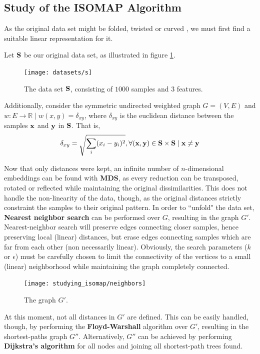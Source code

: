\subsection{Study of the ISOMAP Algorithm}
\label{sec:studying_ISOMAP}

As the original data set might be folded, twisted or curved \cite{ten2000}, we must first find a suitable linear representation for it.

Let $\mathbf{S}$ be our original data set, as illustrated in figure \ref{fig:mani_s}.

\begin{figure}[H]
	\centering
	\captionsetup{justification=centering}
	\texttt{[image: datasets/s]}
	\caption{The data set $\mathbf{S}$, consisting of $1000$ samples and $3$ features.}
	\label{fig:mani_s}
\end{figure}

Additionally, consider the symmetric undirected weighted graph $G=(V, E)$ and $w \colon E \to \mathbb{R} \mid w(x, y) = \delta_{xy}$, where $\delta_{xy}$ is the euclidean distance between the samples $\mathbf{x}$ and $\mathbf{y}$ in $\mathbf{S}$. That is,
$$\delta_{xy} = \sqrt{\sum_{i} (x_i - y_i)^2}, \forall (\mathbf{x}, \mathbf{y}) \in \mathbf{S} \times \mathbf{S} \mid \mathbf{x} \ne \mathbf{y}$$

Now that only distances were kept, an infinite number of $n$-dimensional embeddings can be found with \textbf{MDS}, as every reduction can be transposed, rotated or reflected while maintaining the original dissimilarities. This does not handle the non-linearity of the data, though, as the original distances strictly constraint the samples to their original pattern. In order to ``unfold" the data set, \textbf{Nearest neighbor search} can be performed over $G$, resulting in the graph $G'$. Nearest-neighbor search will preserve edges connecting closer samples, hence preserving local (linear) distances, but erase edges connecting samples which are far from each other (non necessarily linear). Obviously, the search parameters ($k$ or $\epsilon$) must be carefully chosen to limit the connectivity of the vertices to a small (linear) neighborhood while maintaining the graph completely connected.

\begin{figure}[H]
	\centering
	\captionsetup{justification=centering}
	\texttt{[image: studying\_isomap/neighbors]}
	\caption{The graph $G'$.}
	\label{fig:mani_s_graph_h}
\end{figure}

At this moment, not all distances in $G'$ are defined. This can be easily handled, though, by performing the \textbf{Floyd-Warshall} algorithm over $G'$, resulting in the shortest-paths graph $G''$. Alternatively, $G''$ can be achieved by performing \textbf{Dijkstra's algorithm} for all nodes and joining all shortest-path trees found.

